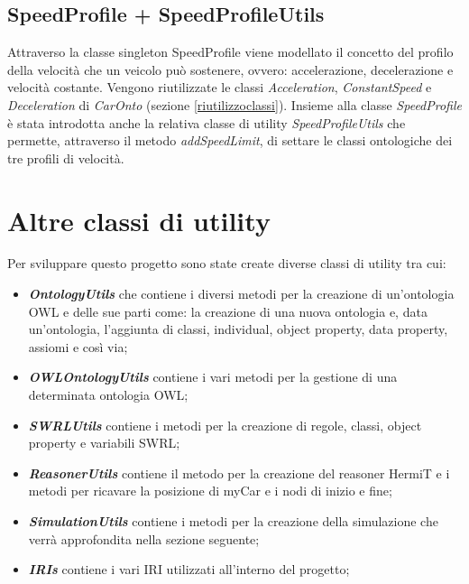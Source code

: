 \subsection{SpeedProfile + SpeedProfileUtils}
Attraverso la classe singleton SpeedProfile viene modellato il concetto del profilo della velocit\`a che un veicolo pu\`o sostenere, ovvero: accelerazione, decelerazione e velocit\`a costante.
Vengono riutilizzate le classi \textit{Acceleration}, \textit{ConstantSpeed} e \textit{Deceleration} di \textit{CarOnto} (sezione \ref{riutilizzoclassi}).
Insieme alla classe \textit{SpeedProfile} \`e stata introdotta anche la relativa classe di utility \textit{SpeedProfileUtils} che permette, attraverso il metodo \textit{addSpeedLimit}, di settare le classi ontologiche dei tre profili di velocit\`a.
\section{Altre classi di utility}
Per sviluppare questo progetto sono state create diverse classi di utility tra cui:
\begin{itemize}
\item \textit{\textbf{OntologyUtils}} che contiene i diversi metodi per la creazione di un'ontologia OWL e delle sue parti come: la creazione di una nuova ontologia e, data un'ontologia, l'aggiunta di classi, individual, object property, data property, assiomi e cos\`i via;
\item \textit{\textbf{OWLOntologyUtils}} contiene i vari metodi per la gestione di una determinata ontologia OWL;
\item \textit{\textbf{SWRLUtils}} contiene i metodi per la creazione di regole, classi, object property e variabili SWRL;
\item \textit{\textbf{ReasonerUtils}} contiene il metodo per la creazione del reasoner HermiT e i metodi per ricavare la posizione di myCar e i nodi di inizio e fine;
\item \textit{\textbf{SimulationUtils}} contiene i metodi per la creazione della simulazione che verr\`a approfondita nella sezione seguente;
\item \textit{\textbf{IRIs}} contiene i vari IRI utilizzati all'interno del progetto;
\end{itemize}

